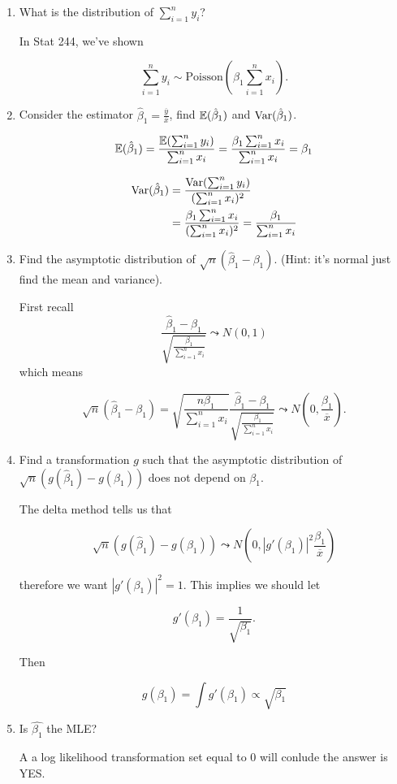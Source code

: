 \documentclass{tufte-book}
\begin{document}
\begin{enumerate}
\item What is the distribution of $\sum_{i=1}^ny_i$?

In Stat 244, we've shown

\[ \sum_{i=1}^ny_i \sim \text{Poisson}(\beta_1\sum_{i=1}^nx_i). \]

\item Consider the estimator $\hat{\beta}_1 = \frac{\overline{y}}{\overline{x}}$, find $\operatorname{\mathbb{E}}(\hat{\beta}_1)$ and $\operatorname{Var}(\hat{\beta}_1)$.

\[ \operatorname{\mathbb{E}}(\hat{\beta}_1) = \frac{\operatorname{\mathbb{E}}(\sum_{i=1}^ny_i)}{\sum_{i=1}^nx_i} = \frac{\beta_1 \sum_{i=1}^nx_i}{\sum_{i=1}^nx_i} = \beta_1 \]

\begin{align*}
\operatorname{Var}(\hat{\beta}_1) &= \frac{\operatorname{Var}(\sum_{i=1}^ny_i)}{(\sum_{i=1}^nx_i)^2}\\
&= \frac{\beta_1\sum_{i=1}^nx_i}{(\sum_{i=1}^nx_i)^2} = \frac{\beta_1}{\sum_{i=1}^nx_i}
\end{align*}

\item Find the asymptotic distribution of $\sqrt{n}(\hat{\beta}_1-\beta_1)$. (Hint: it's normal just find the mean and variance).

First recall
\[ \frac{\hat{\beta}_1-\beta_1}{\sqrt{\frac{\beta_1}{\sum_{i=1}^nx_i}}} \leadsto N(0,1) \]
which means

\[ \sqrt{n}(\hat{\beta}_1-\beta_1) = \sqrt{\frac{n\beta_1}{\sum_{i=1}^nx_i}} \frac{\hat{\beta}_1-\beta_1}{\sqrt{\frac{\beta_1}{\sum_{i=1}^nx_i}}} \leadsto N(0, \frac{\beta_1}{\overline{x}}). \]

\item Find a transformation $g$ such that the asymptotic distribution of $\sqrt{n}(g(\hat{\beta}_1) - g(\beta_1))$  does not depend on $\beta_1$.


The delta method tells us that

\[ \sqrt{n}(g(\hat{\beta}_1) - g(\beta_1)) \leadsto N(0, |g'(\beta_1)|^2\frac{\beta_1}{\overline{x}}) \]

therefore we want $|g'(\beta_1)|^2 = 1$.  This implies we should let

\[ g'(\beta_1) = \frac{1}{\sqrt{\beta_1}}. \]

Then

\[ g(\beta_1) = \int g'(\beta_1) \propto \sqrt{\beta_1} \]

\item Is $\hat{\beta_1}$ the MLE?

A a log likelihood transformation set equal to $0$ will conlude the answer is YES.
\end{enumerate}
\end{document}
